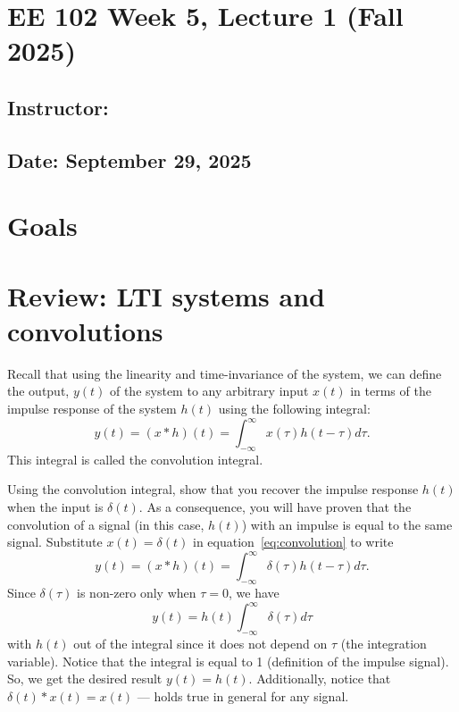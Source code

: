 \documentclass{ee102_notes}
\renewcommand{\releasedate}{September 29, 2025}
\begin{document}
\section*{EE 102 Week 5, Lecture 1 (Fall 2025)}
\subsection*{Instructor: \instructor}
\subsection*{Date: \releasedate}

\section{Goals}

\section{Review: LTI systems and convolutions}
Recall that using the linearity and time-invariance of the system, we can define the output, $y(t)$ of the system to any arbitrary input $x(t)$ in terms of the impulse response of the system $h(t)$ using the following integral:
\begin{equation}
y(t) = (x * h)(t) = \int_{-\infty}^{\infty} x(\tau) h(t - \tau) d\tau.
\label{eq:convolution}
\end{equation}
This integral is called the convolution integral. 
\begin{popquiz}
Using the convolution integral, show that you recover the impulse response $h(t)$ when the input is $\delta(t)$. As a consequence, you will have proven that the convolution of a signal (in this case, $h(t)$) with an impulse is equal to the same signal. 
\popqsplit
Substitute $x(t) = \delta(t)$ in equation~\eqref{eq:convolution} to write
\[
y(t) = (x * h)(t) = \int_{-\infty}^{\infty} \delta(\tau) h(t - \tau) d\tau.
\]
Since $\delta(\tau)$ is non-zero only when $\tau = 0$, we have 
\[
y(t) = h(t)\int_{-\infty}^{\infty} \delta(\tau) d\tau
\]
with $h(t)$ out of the integral since it does not depend on $\tau$ (the integration variable). Notice that the integral is equal to 1 (definition of the impulse signal). So, we get the desired result $y(t) = h(t)$. Additionally, notice that $\delta(t) * x(t) = x(t)$ --- holds true in general for any signal.
\end{popquiz}
\end{document}
